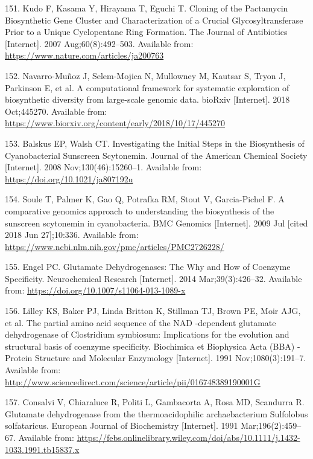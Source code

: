 \documentclass[12pt,twoside]{reedthesis}
\begin{document}
  \hypertarget{ref-kudo_cloning_2007}{}
  151. Kudo F, Kasama Y, Hirayama T, Eguchi T. Cloning of the Pactamycin
  Biosynthetic Gene Cluster and Characterization of a Crucial
  Glycosyltransferase Prior to a Unique Cyclopentane Ring Formation. The
  Journal of Antibiotics {[}Internet{]}. 2007 Aug;60(8):492--503.
  Available from: \url{https://www.nature.com/articles/ja200763}
  
  \hypertarget{ref-navarro-munoz_computational_2018}{}
  152. Navarro-Muñoz J, Selem-Mojica N, Mullowney M, Kautsar S, Tryon J,
  Parkinson E, et al. A computational framework for systematic exploration
  of biosynthetic diversity from large-scale genomic data. bioRxiv
  {[}Internet{]}. 2018 Oct;445270. Available from:
  \url{https://www.biorxiv.org/content/early/2018/10/17/445270}
  
  \hypertarget{ref-balskus_investigating_2008}{}
  153. Balskus EP, Walsh CT. Investigating the Initial Steps in the
  Biosynthesis of Cyanobacterial Sunscreen Scytonemin. Journal of the
  American Chemical Society {[}Internet{]}. 2008 Nov;130(46):15260--1.
  Available from: \url{https://doi.org/10.1021/ja807192u}
  
  \hypertarget{ref-soule_comparative_2009}{}
  154. Soule T, Palmer K, Gao Q, Potrafka RM, Stout V, Garcia-Pichel F. A
  comparative genomics approach to understanding the biosynthesis of the
  sunscreen scytonemin in cyanobacteria. BMC Genomics {[}Internet{]}. 2009
  Jul {[}cited 2018 Jun 27{]};10:336. Available from:
  \url{https://www.ncbi.nlm.nih.gov/pmc/articles/PMC2726228/}
  
  \hypertarget{ref-engel_glutamate_2014}{}
  155. Engel PC. Glutamate Dehydrogenases: The Why and How of Coenzyme
  Specificity. Neurochemical Research {[}Internet{]}. 2014
  Mar;39(3):426--32. Available from:
  \url{https://doi.org/10.1007/s11064-013-1089-x}
  
  \hypertarget{ref-lilley_partial_1991}{}
  156. Lilley KS, Baker PJ, Linda Britton K, Stillman TJ, Brown PE, Moir
  AJG, et al. The partial amino acid sequence of the NAD -dependent
  glutamate dehydrogenase of Clostridium symbiosum: Implications for the
  evolution and structural basis of coenzyme specificity. Biochimica et
  Biophysica Acta (BBA) - Protein Structure and Molecular Enzymology
  {[}Internet{]}. 1991 Nov;1080(3):191--7. Available from:
  \url{http://www.sciencedirect.com/science/article/pii/016748389190001G}
  
  \hypertarget{ref-consalvi_glutamate_1991}{}
  157. Consalvi V, Chiaraluce R, Politi L, Gambacorta A, Rosa MD,
  Scandurra R. Glutamate dehydrogenase from the thermoacidophilic
  archaebacterium Sulfolobus solfataricus. European Journal of
  Biochemistry {[}Internet{]}. 1991 Mar;196(2):459--67. Available from:
  \url{https://febs.onlinelibrary.wiley.com/doi/abs/10.1111/j.1432-1033.1991.tb15837.x}
  
\end{document}
